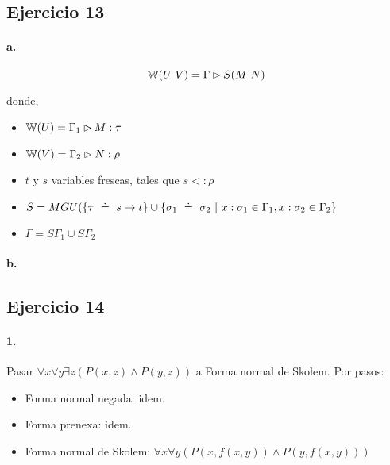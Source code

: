
\subsection*{Ejercicio 13}

\paragraph{a.}

\[\w{U\ V} = \Gamma \rhd S(M\ N)\]

donde,

\begin{itemize}
  \item $\mathbb{W}(U) = \Gamma_1 \rhd M : \tau$
  \item $\mathbb{W}(V) = \Gamma_2 \rhd N : \rho$
  \item $t$ y $s$ variables frescas, tales que $s <: \rho$
  \item $S = MGU(\{\tau \uni s\to t\} \cup \{\sigma_1 \uni \sigma_2 \vert x:\sigma_1 \in \Gamma_1, x:\sigma_2 \in \Gamma_2\}$
  \item $\Gamma = S\Gamma_1 \cup S\Gamma_2$
\end{itemize}


\paragraph{b.}


\subsection*{Ejercicio 14}

\paragraph{1.}

Pasar $\forall x\forall y\exists z (P(x,z)\land P(y,z))$ a Forma normal de Skolem. Por pasos:

\begin{itemize}
  \item Forma normal negada: idem.
  \item Forma prenexa: idem.
  \item Forma normal de Skolem: $\forall x\forall y (P(x,f(x,y))\land P(y,f(x,y)))$
\end{itemize}

